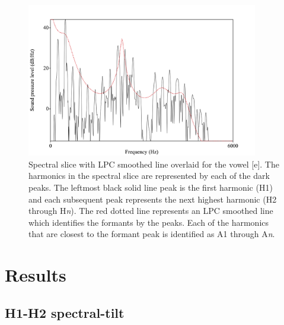 \documentclass[12pt, letterpaper]{article}
\begin{document}
\begin{figure}[!h]
	\centering
	\includegraphics[width=0.9\textwidth]{../Harmonics.png}
	\caption{Spectral slice with LPC smoothed line overlaid for the vowel [e]. The harmonics in the spectral slice are represented by each of the dark peaks. The leftmost black solid line peak is the first harmonic (H1) and each subsequent peak represents the next highest harmonic (H2 through H\textit{n}). The red dotted line represents an LPC smoothed line which identifies the formants by the peaks. Each of the harmonics that are closest to the formant peak is identified as A1 through A\textit{n}.}
	\label{fig:Harmonics}
\end{figure}

\section{Results} \label{sec:Results}

\subsection{H1-H2 spectral-tilt} \label{sec:H1H2}
\end{document}
